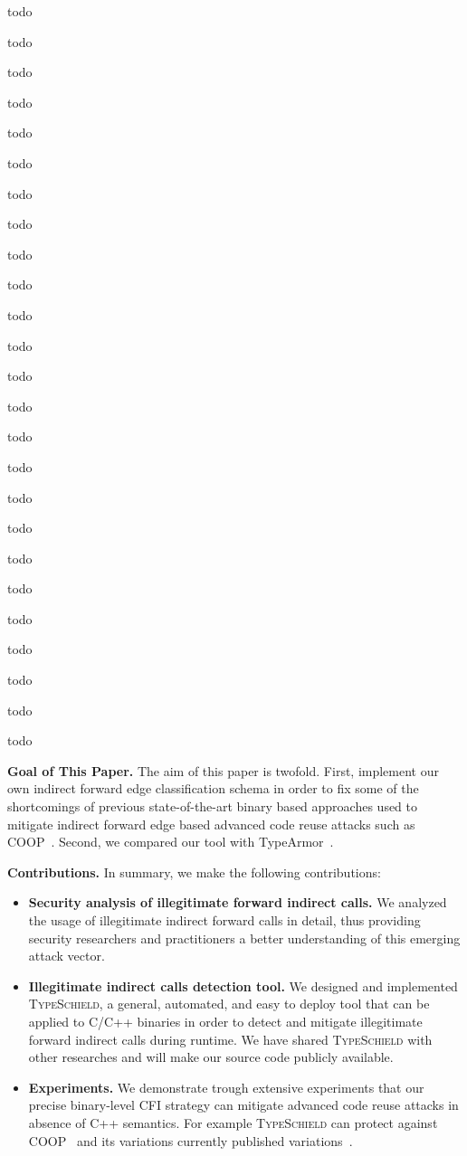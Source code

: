 todo


todo

todo

todo

todo

todo

todo


todo

todo


todo

todo

todo


todo


todo

todo

todo

todo

todo


todo

todo

todo

todo

todo

todo

todo

\textbf{Goal of This Paper.} The aim of this paper is twofold. First, implement our own indirect forward edge 
classification schema in order to fix some of the shortcomings of previous state-of-the-art binary based approaches
used to mitigate indirect forward edge based advanced code reuse attacks such as COOP~\cite{schuster:coop}.
Second, we compared our tool with TypeArmor~\cite{veen:typearmor}.

\textbf{Contributions.} In summary, we make the following contributions:
\label{Contribution}
\begin{itemize}
 \item \textbf{Security analysis of illegitimate forward indirect calls.} 
 We analyzed the usage of illegitimate indirect forward calls in detail,
 thus providing security researchers and
practitioners a better understanding of this emerging
attack vector.

 \item \textbf{Illegitimate indirect calls detection tool.}
 We designed and implemented \textsc{TypeSchield}, a general, automated, and easy to deploy tool
 that can be applied to C/C++ binaries in order to detect and mitigate illegitimate forward indirect calls 
 during runtime. We have shared \textsc{TypeSchield} with other researches and will make our source code 
 publicly available.
 
 \item \textbf{Experiments.} We demonstrate trough extensive experiments that our precise
 binary-level CFI strategy can mitigate advanced code reuse attacks in absence of C++ semantics.
 For example \textsc{TypeSchield} can protect against COOP~\cite{schuster:coop} and its variations currently published 
 variations~\cite{loop:oriented, crane:readactor++, subversive-c:lettner}.
  
\end{itemize}

